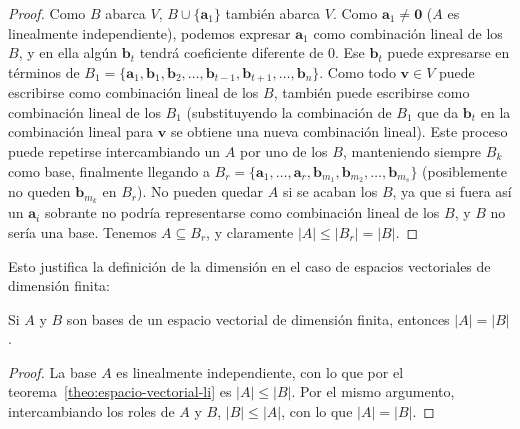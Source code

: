   \begin{proof}
    Como \(B\) abarca \(V\),
    \(B \cup \{\boldsymbol{a}_1\}\) también abarca \(V\).
    Como \(\boldsymbol{a}_1 \ne \boldsymbol{0}\)
    (\(A\) es linealmente independiente),
    podemos expresar \(\boldsymbol{a}_1\)
    como combinación lineal de los \(B\),
    y en ella algún \(\boldsymbol{b}_t\)
    tendrá coeficiente diferente de 0.
    Ese \(\boldsymbol{b}_t\) puede expresarse en términos
    de \(B_1 = \{\boldsymbol{a}_1, \boldsymbol{b}_1,
		   \boldsymbol{b}_2,
		   \dotsc, \boldsymbol{b}_{t - 1},
		   \boldsymbol{b}_{t + 1},
		 \dotsc, \boldsymbol{b}_n\}\).
    Como todo \(\boldsymbol{v} \in V\)
    puede escribirse como combinación lineal
    de los \(B\),
    también puede escribirse como combinación lineal de los \(B_1\)
    (substituyendo la combinación
     de \(B_1\) que da \(\boldsymbol{b}_t\)
     en la combinación lineal para \(\boldsymbol{v}\)
     se obtiene una nueva combinación lineal).
    Este proceso puede repetirse
    intercambiando un \(A\) por uno de los \(B\),
    manteniendo siempre \(B_k\) como base,
    finalmente llegando
    a \(B_r = \{\boldsymbol{a}_1, \dotsc, \boldsymbol{a}_r,
		\boldsymbol{b}_{m_1}, \boldsymbol{b}_{m_2},
		\dotsc, \boldsymbol{b}_{m_s}\}\)
    (posiblemente no queden \(\boldsymbol{b}_{m_k}\) en \(B_r\)).
    No pueden quedar \(A\) si se acaban los \(B\),
    ya que si fuera así un \(\boldsymbol{a}_i\) sobrante
    no podría representarse como combinación lineal
    de los \(B\),
    y \(B\) no sería una base.
    Tenemos \(A \subseteq B_r\),
    y claramente
      \(\lvert A \rvert \le \lvert B_r \rvert = \lvert B \rvert\).
  \end{proof}
  Esto justifica la definición de la dimensión
  en el caso de espacios vectoriales de dimensión finita:
  \begin{corollary}
    \label{cor:espacio-vectorial-dimension}
    Si \(A\) y \(B\) son bases
    de un espacio vectorial de dimensión finita,
    entonces \(\lvert A \rvert = \lvert B \rvert\).
  \end{corollary}
  \begin{proof}
    La base \(A\) es linealmente independiente,
    con lo que por el teorema~\ref{theo:espacio-vectorial-li}
    es \(\lvert A \rvert \le \lvert B \rvert\).
    Por el mismo argumento,
    intercambiando los roles de \(A\) y \(B\),
    \(\lvert B \rvert \le \lvert A \rvert\),
    con lo que \(\lvert A \rvert = \lvert B \rvert\).
  \end{proof}
